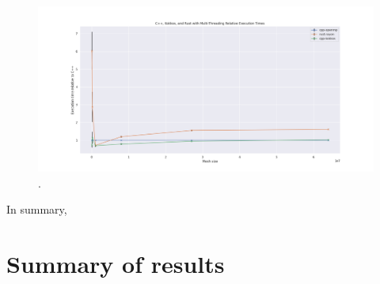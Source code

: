 \begin{figure}[H]
    \centering
    \includegraphics[width=\textwidth]{images/5_performance/parallelism/17_kokkos_line_relative.png}
    \caption{.}
    \label{fig:17_kokkos_line_relative}
\end{figure}



In summary,



\section{Summary of results}
\label{sec:performance-results}


